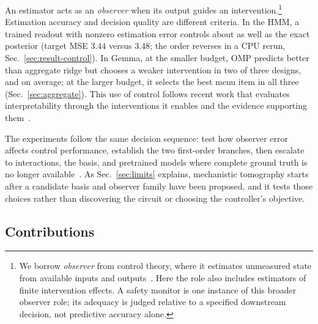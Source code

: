 \documentclass[sigconf,10pt,nonacm,balance=false]{acmart}
\begin{document}
An estimator acts as an \emph{observer} when its output guides an intervention.\footnote{We borrow \emph{observer} from control theory, where it estimates unmeasured state from available inputs and outputs~\cite{luenberger1964observing}. Here the role also includes estimators of finite intervention effects. A safety monitor is one instance of this broader observer role; its adequacy is judged relative to a specified downstream decision, not predictive accuracy alone.} Estimation accuracy and decision quality are different criteria. In the HMM, a trained readout with nonzero estimation error controls about as well as the exact posterior (target MSE $3.44$ versus $3.48$; the order reverses in a CPU rerun, Sec.~\ref{sec:result-control}). In Gemma, at the smaller budget, OMP predicts better than aggregate ridge but chooses a weaker intervention in two of three designs, and on average; at the larger budget, it selects the best menu item in all three (Sec.~\ref{sec:aggregate}). This use of control follows recent work that evaluates interpretability through the interventions it enables and the evidence supporting them~\cite{bhalla2025unifying,orgad2026actionable}.

The experiments follow the same decision sequence: test how observer error affects control performance, establish the two first-order branches, then escalate to interactions, the basis, and pretrained models where complete ground truth is no longer available~\cite{lindner2023tracr,wang2022ioi,qwen2025report}. As Sec.~\ref{sec:limits} explains, mechanistic tomography starts after a candidate basis and observer family have been proposed, and it tests those choices rather than discovering the circuit or choosing the controller's objective.

\subsection*{Contributions}
\end{document}
